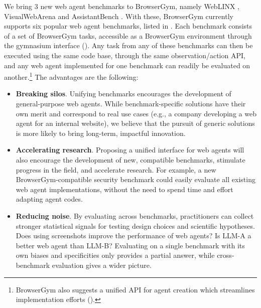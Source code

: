 \documentclass[10pt]{article} %
\begin{document}
We bring 3 new web agent benchmarks to BrowserGym, namely WebLINX \citep{weblinx}, VisualWebArena \citep{visual-webarena} and AssistantBench \citep{assistant-bench}. With these, BrowserGym currently supports six popular web agent benchmarks, listed in . Each benchmark consists of a set of BrowserGym tasks, accessible as a BrowserGym environment through the gymnasium interface ().
Any task from any of these benchmarks can then be executed using the same code base, through the same observation/action API, and any web agent implemented for one benchmark can readily be evaluated on another.\footnote{BrowserGym also suggests a unified API for agent creation which streamlines implementation efforts ().} The advantages are the following:
\begin{itemize}
    \item \textbf{Breaking silos}. Unifying benchmarks encourages the development of general-purpose web agents. While benchmark-specific solutions have their own merit \citep{rci-agent,step-agent} and correspond to real use cases (e.g., a company developing a web agent for an internal website), we believe that the pursuit of generic solutions is more likely to bring long-term, impactful innovation.
    
    \item \textbf{Accelerating research}. Proposing a unified interface for web agents will also encourage the development of new, compatible benchmarks, stimulate progress in the field, and accelerate research. For example, a new BrowserGym-compatible security benchmark could easily evaluate all existing web agent implementations, without the need to spend time and effort adapting agent codes.
    
    \item \textbf{Reducing noise}. By evaluating across benchmarks, practitioners can collect stronger statistical signals for testing design choices and scientific hypotheses. Does using screenshots improve the performance of web agents? Is LLM-A a better web agent than LLM-B? Evaluating on a single benchmark with its own biases and specificities only provides a partial answer, while cross-benchmark evaluation gives a wider picture.

\end{itemize}
\end{document}
